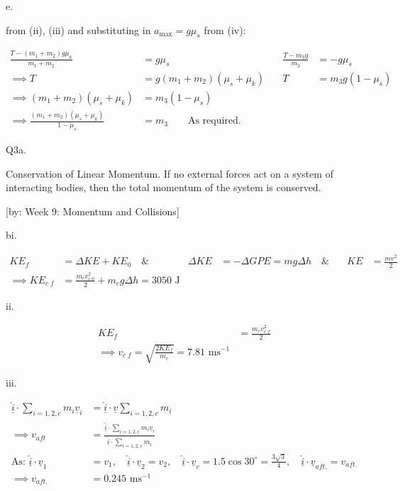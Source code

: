 \documentclass[12pt]{article}
\begin{document}
    e.

    from (ii), (iii) and substituting in $a_{\max}=g\mu_s$ from (iv):


    \begin{equation*}
        \begin{alignedat}{2}
            \frac{T-(m_1+m_2)g\mu_k}{m_1+m_2} &= g\mu_s \quad & \frac{T-m_3g}{m_3} &= -g\mu_s \\
            \implies T &= g(m_1+m_2)(\mu_s+\mu_k) \quad & T &= m_3g(1-\mu_s)\\
            \implies (m_1+m_2)(\mu_s+\mu_k)&=m_3(1-\mu_s)\\
            \implies \frac{(m_1+m_2)(\mu_s+\mu_k)}{1-\mu_s}&=m_3\qquad\text{As required.}
        \end{alignedat}
    \end{equation*}

    Q3a.
    
    Conservation of Linear Momentum. If no external forces act on a system of interacting bodies, then the total momentum of the system is conserved.
    
    [by: Week 9: Momentum and Collisions]

    bi.

    \begin{equation*}
        \begin{alignedat}{3}
        KE_f&=\Delta KE+KE_0\quad\&\quad&\Delta KE&=-\Delta GPE=mg\Delta h\quad\&\quad&KE&=\frac{mv^2}{2}\\
        \implies KE_{c\;f}&=\frac{m_{c}v_{c\;0}^2}{2}+m_{c}g\Delta h=3050\text{ J}
        \end{alignedat}
    \end{equation*}

    ii.

    \begin{equation*}
        \begin{alignedat}{3}
            KE_f&=\frac{m_{c}v_{c\;f}^2}{2}\\
            \implies v_{c\;f}=\sqrt{\frac{2KE_f}{m_{c}}}=7.81\text{ ms$^{-1}$}
            \end{alignedat}
    \end{equation*}

    iii.

    \begin{equation*}
        \begin{alignedat}{1}
            \hat{\underline{i}}\cdot\sum_{i=1,2,c}m_i\underline{v}_i&=\hat{\underline{i}}\cdot \underline{v}\sum_{i=1,2,c}m_i\\
            \implies v_{aft}&=\frac{\hat{\underline{i}}\cdot\sum_{i=1,2,c}m_i\underline{v}_i}{\hat{\underline{i}}\cdot\sum_{i=1,2,c}m_i}\\
            \text{As: }\hat{\underline{i}}\cdot{\underline{v}}_1&=v_1,\quad\hat{\underline{i}}\cdot{\underline{v}}_2=v_2,\quad\hat{\underline{i}}\cdot{\underline{v}}_c=1.5\cos{30^\circ}=\frac{3\sqrt{3}}{4},\quad\hat{\underline{i}}\cdot{\underline{v}}_{aft.}=v_{aft.}\\
            \implies v_{aft.}&=0.245\text{ ms$^{-1}$}
            \end{alignedat}
    \end{equation*}
\end{document}
